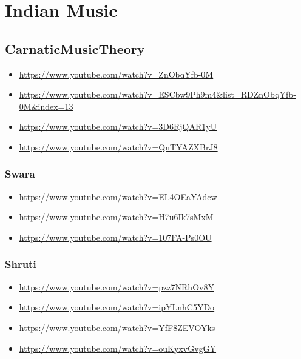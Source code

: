 \noindent
\section{Indian Music}
\label{sec:org313a7b3}

\subsection{CarnaticMusicTheory}
\label{sec:org36c5cda}
\begin{itemize}
\item \url{https://www.youtube.com/watch?v=ZnObqYfb-0M}
\item \url{https://www.youtube.com/watch?v=ESCbw9Ph9m4\&list=RDZnObqYfb-0M\&index=13}
\item \url{https://www.youtube.com/watch?v=3D6RjQAR1yU}
\item \url{https://www.youtube.com/watch?v=QnTYAZXBrJ8}
\end{itemize}

\subsubsection{Swara}
\label{sec:orgdb7fbd7}
\begin{itemize}
\item \url{https://www.youtube.com/watch?v=EL4OEaYAdcw}
\item \url{https://www.youtube.com/watch?v=H7u6Ik7sMxM}
\item \url{https://www.youtube.com/watch?v=107FA-Ps0OU}
\end{itemize}

\subsubsection{Shruti}
\label{sec:orgfb10ba2}
\begin{itemize}
\item \url{https://www.youtube.com/watch?v=pzz7NRhOv8Y}
\item \url{https://www.youtube.com/watch?v=ipYLnhC5YDo}
\item \url{https://www.youtube.com/watch?v=YfF8ZEVOYks}
\item \url{https://www.youtube.com/watch?v=ouKyxvGvgGY}
\end{itemize}

